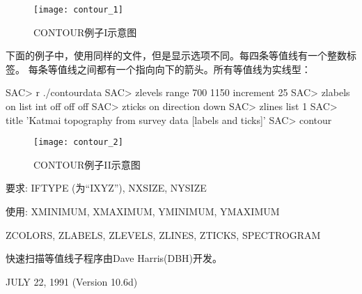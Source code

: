 \begin{figure}[h]
\centering
\texttt{[image: contour\_1]}
\caption{CONTOUR例子I示意图}
\end{figure}

下面的例子中，使用同样的文件，但是显示选项不同。每四条等值线有一个整数标签。	每条等值线之间都有一个指向向下的箭头。所有等值线为实线型：
\begin{SACCode}
SAC> r ./contourdata 
SAC> zlevels range 700 1150 increment 25
SAC> zlabels on list int off off off
SAC> zticks on direction down
SAC> zlines list 1
SAC> title 'Katmai topography from survey data [labels and ticks]'
SAC> contour
\end{SACCode}

\begin{figure}[h]
\centering
\texttt{[image: contour\_2]}
\caption{CONTOUR例子II示意图}
\end{figure}

要求: IFTYPE (为``IXYZ''), NXSIZE, NYSIZE

使用: XMINIMUM, XMAXIMUM, YMINIMUM, YMAXIMUM

ZCOLORS, ZLABELS, ZLEVELS, ZLINES, ZTICKS, SPECTROGRAM

快速扫描等值线子程序由Dave Harris(DBH)开发。

JULY 22, 1991 (Version 10.6d)
